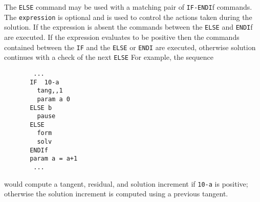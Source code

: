 \headb

The {\tt ELSE} command may be used with a matching pair of
{\tt IF-ENDI}f commands.
The {\tt expression} is optional and
is used to control the actions taken during the
solution.
If the expression is absent the commands between the {\tt ELSE} and
{\tt ENDI}f are executed.
If the expression evaluates to be positive then the commands
contained between the {\tt IF} and the {\tt ELSE} or {\tt ENDI} are 
executed, otherwise solution continues with a check of the next {\tt ELSE}
For example, the sequence
\begin{verbatim}
        ...
       IF  10-a
         tang,,1
         param a 0
       ELSE b
         pause
       ELSE
         form
         solv
       ENDIf
       param a = a+1
        ...
\end{verbatim}
would compute a tangent, residual, and solution increment if {\tt 10-a}
is positive; otherwise the solution increment is computed using a
previous tangent.
\vfill\eject
